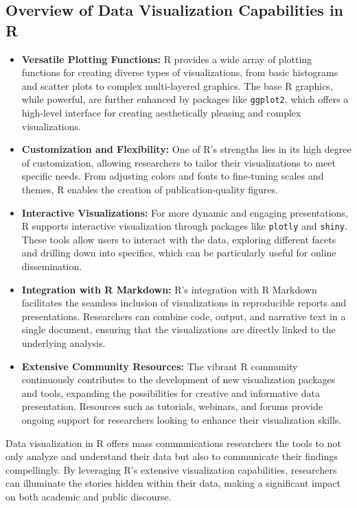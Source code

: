 \documentclass[
]{book}
\begin{document}
\subsection*{Overview of Data Visualization Capabilities in R}\label{overview-of-data-visualization-capabilities-in-r}

\begin{itemize}
\item
  \textbf{Versatile Plotting Functions:} R provides a wide array of plotting functions for creating diverse types of visualizations, from basic histograms and scatter plots to complex multi-layered graphics. The base R graphics, while powerful, are further enhanced by packages like \texttt{ggplot2}, which offers a high-level interface for creating aesthetically pleasing and complex visualizations.
\item
  \textbf{Customization and Flexibility:} One of R's strengths lies in its high degree of customization, allowing researchers to tailor their visualizations to meet specific needs. From adjusting colors and fonts to fine-tuning scales and themes, R enables the creation of publication-quality figures.
\item
  \textbf{Interactive Visualizations:} For more dynamic and engaging presentations, R supports interactive visualization through packages like \texttt{plotly} and \texttt{shiny}. These tools allow users to interact with the data, exploring different facets and drilling down into specifics, which can be particularly useful for online dissemination.
\item
  \textbf{Integration with R Markdown:} R's integration with R Markdown facilitates the seamless inclusion of visualizations in reproducible reports and presentations. Researchers can combine code, output, and narrative text in a single document, ensuring that the visualizations are directly linked to the underlying analysis.
\item
  \textbf{Extensive Community Resources:} The vibrant R community continuously contributes to the development of new visualization packages and tools, expanding the possibilities for creative and informative data presentation. Resources such as tutorials, webinars, and forums provide ongoing support for researchers looking to enhance their visualization skills.
\end{itemize}

Data visualization in R offers mass communications researchers the tools to not only analyze and understand their data but also to communicate their findings compellingly. By leveraging R's extensive visualization capabilities, researchers can illuminate the stories hidden within their data, making a significant impact on both academic and public discourse.
\end{document}

